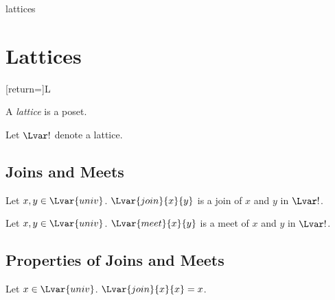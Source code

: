 \documentclass{stex}
\begin{document}
\begin{smodule}{lattices}


  \section{Lattices}
  [return=\lattice]{\mathcal L}

  \begin{forthel}
  \end{forthel}
  
  \begin{forthel}
    \begin{signature}
      A \emph{lattice} is a poset.
    \end{signature}

    Let $\Lvar!$ denote a lattice.
  \end{forthel}
  
  \subsection{Joins and Meets}
  
  \begin{forthel}
    \begin{signature}
      Let $x,y\in\Lvar{univ}$.
      $\Lvar{join}{x}{y}$ is a join of $x$ and $y$ in $\Lvar!$.
    \end{signature}

    \begin{signature}
      Let $x,y\in\Lvar{univ}$.
      $\Lvar{meet}{x}{y}$ is a meet of $x$ and $y$ in $\Lvar!$.
    \end{signature}
  \end{forthel}

  \subsection{Properties of Joins and Meets}

  \begin{forthel}
    \begin{proposition}
      Let $x\in\Lvar{univ}$.
      $\Lvar{join}{x}{x}=x$.
    \end{proposition}


\end{forthel}
\end{smodule}
\end{document}
